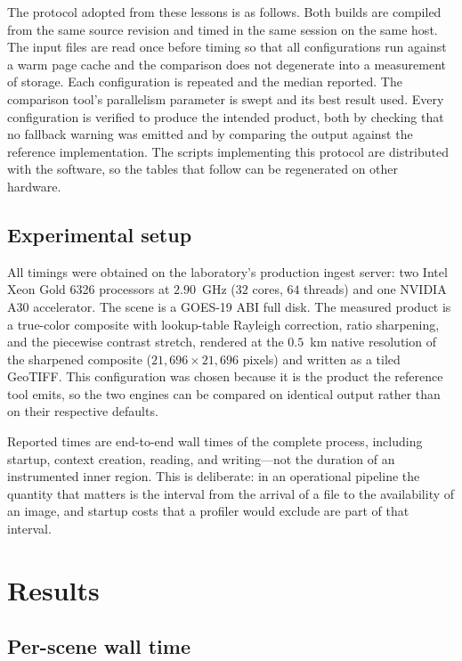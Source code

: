 \documentclass{ametsocV6.1}
\begin{document}
The protocol adopted from these lessons is as follows. Both builds are compiled
from the same source revision and timed in the same session on the same host.
The input files are read once before timing so that all configurations run
against a warm page cache and the comparison does not degenerate into a
measurement of storage. Each configuration is repeated and the median reported.
The comparison tool's parallelism parameter is swept and its best result used.
Every configuration is verified to produce the intended product, both by
checking that no fallback warning was emitted and by comparing the output
against the reference implementation. The scripts implementing this protocol
are distributed with the software, so the tables that follow can be regenerated
on other hardware.

\subsection{Experimental setup}
\label{sec:setup}

All timings were obtained on the laboratory's production ingest server: two
Intel Xeon Gold 6326 processors at $2.90$~GHz ($32$ cores, $64$ threads) and one
NVIDIA A30 accelerator. The scene is a GOES-19 ABI full disk. The measured
product is a true-color composite with lookup-table Rayleigh correction,
ratio sharpening, and the piecewise contrast stretch, rendered at the
$0.5$~km native resolution of the sharpened composite
($21{,}696 \times 21{,}696$ pixels) and written as a tiled GeoTIFF. This
configuration was chosen because it is the product the reference tool emits, so
the two engines can be compared on identical output rather than on their
respective defaults.

Reported times are end-to-end wall times of the complete process, including
startup, context creation, reading, and writing---not the duration of an
instrumented inner region. This is deliberate: in an operational pipeline the
quantity that matters is the interval from the arrival of a file to the
availability of an image, and startup costs that a profiler would exclude are
part of that interval.

\section{Results}
\label{sec:results}

\subsection{Per-scene wall time}
\label{sec:walltime}
\end{document}
